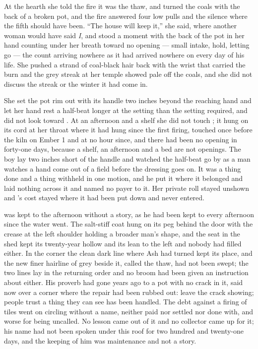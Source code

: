 At the hearth she told the fire it was the thaw, and turned the coals with the back of a broken pot, and the fire answered four low pulls and the silence where the fifth should have been. “The house will keep it,” she said, where another woman would have said \emph{I}, and stood a moment with the back of the pot in her hand counting under her breath toward no opening --- small intake, hold, letting go --- the count arriving nowhere as it had arrived nowhere on every day of his life. She pushed a strand of coal-black hair back with the wrist that carried the burn and the grey streak at her temple showed pale off the coals, and she did not discuss the streak or the winter it had come in.

She set the pot rim out with its handle two inches beyond the reaching hand and let her hand rest a half-beat longer at the setting than the setting required, and did not look toward . At an afternoon and a shelf she did not touch ; it hung on its cord at her throat where it had hung since the first firing, touched once before the kiln on Ember 1 and at no hour since, and there had been no opening in forty-one days, because a shelf, an afternoon and a bed are not openings. The boy lay two inches short of the handle and watched the half-beat go by as a man watches a hand come out of a field before the dressing goes on. It was a thing done and a thing withheld in one motion, and he put it where it belonged and laid nothing across it and named no payer to it. Her private roll stayed unshown and 's cost stayed where it had been put down and never entered.

\scenebreak

 was kept to the afternoon without a story, as he had been kept to every afternoon since the water went. The salt-stiff coat hung on its peg behind the door with the crease at the left shoulder holding a broader man's shape, and the seat in the shed kept its twenty-year hollow and its lean to the left and nobody had filled either. In the corner the clean dark line where Ash had turned kept its place, and the new finer hairline of grey beside it, called the thaw, had not been swept; the two lines lay in the returning order and no broom had been given an instruction about either. His proverb had gone years ago to a pot with no crack in it, said now over a corner where the repair had been rubbed out: leave the crack showing; people trust a thing they can see has been handled. The debt against a firing of tiles went on circling without a name, neither paid nor settled nor done with, and worse for being uncalled. No lesson came out of it and no collector came up  for it; his name had not been spoken under this roof for two hundred and twenty-one days, and the keeping of him was maintenance and not a story.

